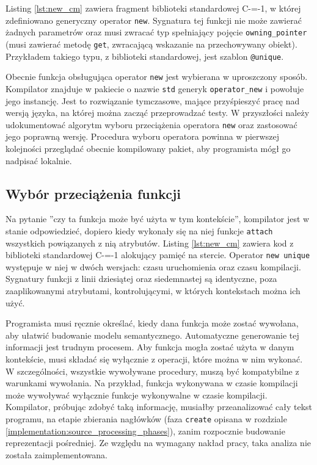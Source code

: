 Listing \ref{lst:new_cm} zawiera fragment biblioteki standardowej C-=-1, w której zdefiniowano generyczny operator \lstinline{new}.
Sygnatura tej funkcji nie może zawierać żadnych parametrów oraz musi zwracać typ spełniający pojęcie \lstinline{owning_pointer} (musi zawierać metodę \lstinline{get}, zwracającą wskazanie na przechowywany obiekt).
Przykładem takiego typu, z biblioteki standardowej, jest szablon \lstinline{@unique}.

Obecnie funkcja obsługująca operator \lstinline{new} jest wybierana w uproszczony sposób.
Kompilator znajduje w pakiecie o nazwie \lstinline{std} generyk \lstinline{operator_new} i powołuje jego instancję.
Jest to rozwiązanie tymczasowe, mające przyśpieszyć pracę nad wersją języka, na której można zacząć przeprowadzać testy.
W przyszłości należy udokumentować algorytm wyboru przeciążenia operatora \lstinline{new} oraz zastosować jego poprawną wersję.
Procedura wyboru operatora powinna w pierwszej kolejności przeglądać obecnie kompilowany pakiet, aby programista mógł go nadpisać lokalnie.

\begin{minipage}{\textwidth}
	
	
		
\end{minipage}

\subsection{Wybór przeciążenia funkcji}
\label{Function_overload_resolution}

Na pytanie ''czy ta funkcja może być użyta w tym kontekście'', kompilator jest w stanie odpowiedzieć, dopiero kiedy wykonały się na niej funkcje \lstinline{attach} wszystkich powiązanych z nią atrybutów.
Listing \ref{lst:new_cm} zawiera kod z biblioteki standardowej C-=-1 alokujący pamięć na stercie.
Operator \lstinline{new unique} występuje w niej w dwóch wersjach: czasu uruchomienia oraz czasu kompilacji.
Sygnatury funkcji z linii dziesiątej oraz siedemnastej są identyczne, poza zaaplikowanymi atrybutami, kontrolującymi, w których kontekstach można ich użyć.

Programista musi ręcznie określać, kiedy dana funkcja może zostać wywołana, aby ułatwić budowanie modelu semantycznego.
Automatyczne generowanie tej informacji jest trudnym procesem.
Aby funkcja mogła zostać użyta w danym kontekście, musi składać się wyłącznie z operacji, które można w nim wykonać.
W szczególności, wszystkie  wywoływane procedury, muszą być kompatybilne z warunkami wywołania.
Na przykład, funkcja wykonywana w czasie kompilacji może wywoływać wyłącznie funkcje wykonywalne w czasie kompilacji.
Kompilator, próbując zdobyć taką informację, musiałby przeanalizować cały tekst programu, na etapie zbierania nagłówków (faza \lstinline{create} opisana w rozdziale \ref{implementation:source_processing_phases}), zanim rozpocznie budowanie reprezentacji pośredniej.
Ze względu na wymagany nakład pracy, taka analiza nie została zaimplementowana.

